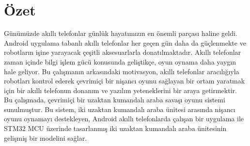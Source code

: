 \chapter*{Özet}


Günümüzde akıllı telefonlar günlük hayatımızın en önemli parçası haline geldi. Android uygulama tabanlı akıllı telefonlar her geçen gün daha da güçlenmekte ve robotların işine yarayacak çeşitli aksesuarlarla donatılmaktadır. Akıllı telefonlar zaman içinde bilgi işlem gücü konusunda geliştikçe, oyun oynama daha yaygın hale geliyor. Bu çalışmanın arkasındaki motivasyon, akıllı telefonlar aracılığıyla robotları kontrol ederek çevrimiçi bir nişancı oyunu sağlayan bir ortam yaratmak için bir akıllı telefonun donanım ve yazılım yeteneklerini bir araya getirmektir.\\

Bu çalışmada, çevrimiçi bir uzaktan kumandalı araba savaşı oyunu sistemi sunulmuştur. Bu sistem, iki uzaktan kumandalı araba ünitesi arasında nişancı oyunu oynamayı destekleyen, Android akıllı telefonlarda çalışan bir uygulama ile STM32 MCU üzerinde tasarlanmış iki uzaktan kumandalı araba ünitesinin gelişmiş bir modelini sağlar.

\vfill
\clearpage
